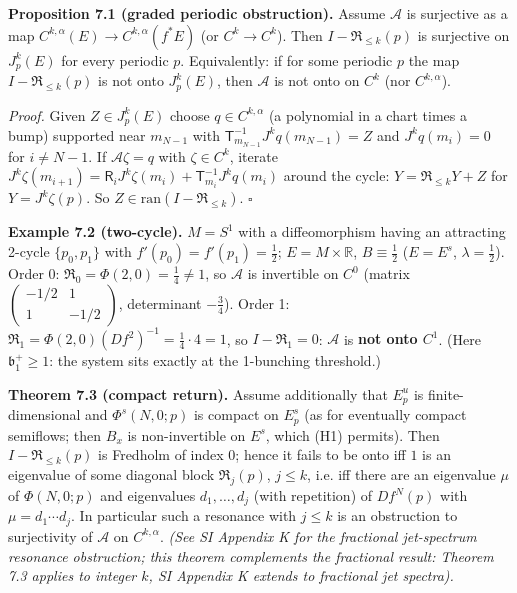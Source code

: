 \documentclass[11pt,a4paper]{article}
\theoremstyle{plain}
\theoremstyle{definition}
\theoremstyle{remark}
\numberwithin{equation}{section}
\numberwithin{figure}{section}
\begin{document}
\textbf{Proposition 7.1 (graded periodic obstruction).} Assume $\mathcal A$ is surjective as a map $C^{k,\alpha}(E)\to C^{k,\alpha}(f^*E)$ (or $C^k\to C^k$). Then $I-\mathfrak R_{\le k}(p)$ is surjective on $J^k_p(E)$ for every periodic $p$. Equivalently: if for some periodic $p$ the map $I-\mathfrak R_{\le k}(p)$ is not onto $J^k_p(E)$, then $\mathcal A$ is not onto on $C^k$ (nor $C^{k,\alpha}$).

\textit{Proof.} Given $Z\in J^k_p(E)$ choose $q\in C^{k,\alpha}$ (a polynomial in a chart times a bump) supported near $m_{N-1}$ with $\mathsf T_{m_{N-1}}^{-1}J^kq(m_{N-1})=Z$ and $J^kq(m_i)=0$ for $i\ne N-1$. If $\mathcal A\zeta=q$ with $\zeta\in C^k$, iterate $J^k\zeta(m_{i+1})=\mathsf R_iJ^k\zeta(m_i)+\mathsf T^{-1}_{m_i}J^kq(m_i)$ around the cycle: $Y=\mathfrak R_{\le k}Y+Z$ for $Y=J^k\zeta(p)$. So $Z\in\mathrm{ran}(I-\mathfrak R_{\le k})$. $\square$

\textbf{Example 7.2 (two-cycle).} $M=S^1$ with a diffeomorphism having an attracting 2-cycle $\{p_0,p_1\}$ with $f'(p_0)=f'(p_1)=\tfrac12$; $E=M\times\mathbb R$, $B\equiv\tfrac12$ ($E=E^s$, $\lambda=\tfrac12$). Order 0: $\mathfrak R_0=\Phi(2,0)=\tfrac14\ne1$, so $\mathcal A$ is invertible on $C^0$ (matrix $\begin{pmatrix}-1/2&1\\1&-1/2\end{pmatrix}$, determinant $-\tfrac34$). Order 1: $\mathfrak R_1=\Phi(2,0)(Df^2)^{-1}=\tfrac14\cdot4=1$, so $I-\mathfrak R_1=0$: $\mathcal A$ is \textbf{not onto $C^1$}. (Here $\mathfrak b_1^+\ge1$: the system sits exactly at the 1-bunching threshold.)

\textbf{Theorem 7.3 (compact return).} Assume additionally that $E^u_p$ is finite-dimensional and $\Phi^s(N,0;p)$ is compact on $E^s_p$ (as for eventually compact semiflows; then $B_x$ is non-invertible on $E^s$, which (H1) permits). Then $I-\mathfrak R_{\le k}(p)$ is Fredholm of index $0$; hence it fails to be onto iff $1$ is an eigenvalue of some diagonal block $\mathfrak R_j(p)$, $j\le k$, i.e. iff there are an eigenvalue $\mu$ of $\Phi(N,0;p)$ and eigenvalues $d_1,\dots,d_j$ (with repetition) of $Df^N(p)$ with $\mu=d_1\cdots d_j$. In particular such a resonance with $j\le k$ is an obstruction to surjectivity of $\mathcal A$ on $C^{k,\alpha}$. \textit{(See SI Appendix K for the fractional jet-spectrum resonance obstruction; this theorem complements the fractional result: Theorem 7.3 applies to integer $k$, SI Appendix K extends to fractional jet spectra).}
\end{document}

